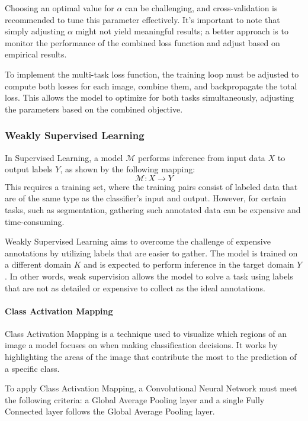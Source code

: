 Choosing an optimal value for $\alpha$ can be challenging, and cross-validation is recommended to tune this parameter effectively.
It's important to note that simply adjusting $\alpha$ might not yield meaningful results; a better approach is to monitor the performance of the combined loss function and adjust based on empirical results.

To implement the multi-task loss function, the training loop must be adjusted to compute both losses for each image, combine them, and backpropagate the total loss. 
This allows the model to optimize for both tasks simultaneously, adjusting the parameters based on the combined objective.

\subsubsection{Weakly Supervised Learning}
In Supervised Learning, a model $\mathcal{M}$ performs inference from input data $X$ to output labels $Y$, as shown by the following mapping: 
\[\mathcal{M}:X\rightarrow Y\]
This requires a training set, where the training pairs consist of labeled data that are of the same type as the classifier's input and output. 
However, for certain tasks, such as segmentation, gathering such annotated data can be expensive and time-consuming.

Weakly Supervised Learning aims to overcome the challenge of expensive annotations by utilizing labels that are easier to gather.
The model is trained on a different domain $K$ and is expected to perform inference in the target domain $Y$. 
In other words, weak supervision allows the model to solve a task using labels that are not as detailed or expensive to collect as the ideal annotations.

\paragraph*{Class Activation Mapping}
Class Activation Mapping is a technique used to visualize which regions of an image a model focuses on when making classification decisions. 
It works by highlighting the areas of the image that contribute the most to the prediction of a specific class.

To apply Class Activation Mapping, a Convolutional Neural Network must meet the following criteria: a Global Average Pooling layer and a single Fully Connected layer follows the Global Average Pooling layer. 

